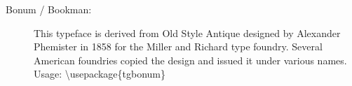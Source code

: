 \documentclass{article}
\begin{document}
\frenchspacing

\begin{description}
\item[Bonum / Bookman:]
This typeface is derived from Old Style
Antique designed by Alexander Phemister in 1858 for the Miller and Richard
type foundry. Several American foundries copied the design
and issued it under various names.\\
Usage: \textbackslash usepackage\{tgbonum\}
\end{description}
\end{document}
